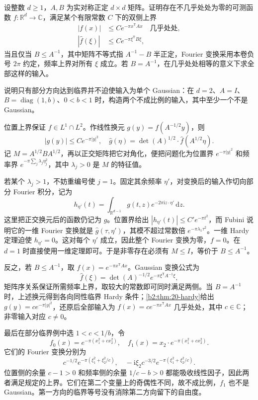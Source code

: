 \begin{optionalexercise}\label{b2:ex:20-new-4}
设整数 \(d\geq1\)，\(A,B\) 为实对称正定 \(d\times d\) 矩阵。证明存在不几乎处处为零的可测函数 \(f:\mathbb R^d\to\mathbb C\)，满足某个有限常数 \(C\) 下的双侧上界
\[
 \begin{aligned}
 |f(x)|&\leq C e^{-\pi x^{\mathsf T}Ax}\quad\text{几乎处处},\\
 |\widehat f(\xi)|&\leq C e^{-\pi\xi^{\mathsf T}B\xi},
 \end{aligned}
\]
当且仅当 \(B\leq A^{-1}\)，其中矩阵不等式指 \(A^{-1}-B\) 半正定，Fourier 变换采用本卷负号 \(2\pi\) 约定，频率上界对所有 \(\xi\) 成立。若 \(B=A^{-1}\)，在几乎处处相等的意义下求全部这样的输入。

\ProseParagraphBreak

说明只有部分方向达到临界并不迫使输入为单个 Gaussian：在 \(d=2\)、\(A=I\)、\(B=\operatorname{diag}(1,b)\)、\(0<b<1\) 时，构造两个不成比例的输入，其中至少一个不是 Gaussian。
\end{optionalexercise}
\begin{solution}
位置上界保证 \(f\in L^1\cap L^2\)。作线性换元
\(g(y)=f(A^{-1/2}y)\)，则
\[
 |g(y)|\leq C e^{-\pi|y|^2},
 \quad \widehat g(\eta)=\det(A)^{1/2}\cdot\widehat f(A^{1/2}\eta).
\]
记 \(M=A^{1/2}BA^{1/2}\)，再以正交矩阵把它对角化，便把问题化为位置界 \(e^{-\pi|y|^2}\) 和频率界
\(e^{-\pi\sum_j\lambda_j\eta_j^2}\)，其中 \(\lambda_j>0\) 是 \(M\) 的特征值。

若某个 \(\lambda_j>1\)，不妨重编号使 \(j=1\)。固定其余频率 \(\eta'\)，对变换后的输入作切向部分 Fourier 积分，记为
\[
 h_{\eta'}(t)=\int_{\mathbb R^{d-1}}
                 g(t,z)e^{-2\pi\mathrm i z\cdot\eta'}\,\mathrm dz.
\]
这里把正交换元后的函数仍记为 \(g\)。位置界给出 \(|h_{\eta'}(t)|\leq C'e^{-\pi t^2}\)，而 Fubini 说明它的一维 Fourier 变换就是 \(\widehat g(\tau,\eta')\)，其模不超过常数倍 \(e^{-\pi\lambda_1\tau^2}\)。一维 Hardy 定理迫使 \(h_{\eta'}=0\)。这对每个 \(\eta'\) 成立，因此整个 Fourier 变换为零，\(f=0\)。在 \(d=1\) 时直接使用一维定理即可。于是非零存在必须有 \(M\leq I\)，等价于 \(B\leq A^{-1}\)。

反之，若 \(B\leq A^{-1}\)，取
\(f(x)=e^{-\pi x^{\mathsf T}Ax}\)。Gaussian 变换公式为
\[
 \widehat f(\xi)=\det(A)^{-1/2}
                     e^{-\pi\xi^{\mathsf T}A^{-1}\xi},
\]
矩阵序关系保证所需频率上界，取较大的常数即可同时满足两侧。当 \(B=A^{-1}\) 时，上述换元得到各向同性临界 Hardy 条件；\cref{b2:thm:20-hardy}给出 \(g(y)=c e^{-\pi|y|^2}\)，还原后全部输入为
\(f(x)=c e^{-\pi x^{\mathsf T}Ax}\) 几乎处处，其中 \(c\in\mathbb C\)；非零输入对应 \(c\ne0\)。

最后在部分临界例中选 \(1<c<1/b\)，令
\[
 f_0(x)=e^{-\pi(x_1^2+cx_2^2)},
 \quad f_1(x)=x_2\cdot e^{-\pi(x_1^2+cx_2^2)}.
\]
它们的 Fourier 变换分别为
\[
 c^{-1/2}e^{-\pi(\xi_1^2+\xi_2^2/c)},
 \quad-\mathrm i\xi_2c^{-3/2}
                       e^{-\pi(\xi_1^2+\xi_2^2/c)}.
\]
位置侧的余量 \(c-1>0\) 和频率侧的余量 \(1/c-b>0\) 都能吸收线性因子，因此两者满足规定的上界。它们在第二个变量上的奇偶性不同，故不成比例，\(f_1\) 也不是 Gaussian。第一方向的临界等号没有消除第二方向留下的自由度。
\end{solution}

